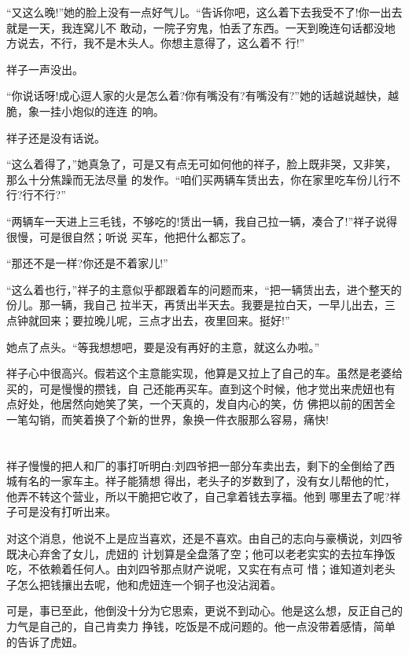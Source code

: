 \documentclass[11pt,a4paper,onecolumn]{article}
\begin{document}
``又这么晚!''她的脸上没有一点好气儿。``告诉你吧，这么着下去我受不了!你一出去就是一天，我连窝儿不
敢动，一院子穷鬼，怕丢了东西。一天到晚连句话都没地方说去，不行，我不是木头人。你想主意得了，这么着不
行!''

祥子一声没出。

``你说话呀!成心逗人家的火是怎么着?你有嘴没有?有嘴没有?''她的话越说越快，越脆，象一挂小炮似的连连
的响。

祥子还是没有话说。

``这么着得了，''她真急了，可是又有点无可如何他的祥子，脸上既非哭，又非笑，那么十分焦躁而无法尽量
的发作。``咱们买两辆车赁出去，你在家里吃车份儿行不行?行不行?''

``两辆车一天进上三毛钱，不够吃的!赁出一辆，我自己拉一辆，凑合了!''祥子说得很慢，可是很自然；听说
买车，他把什么都忘了。

``那还不是一样?你还是不着家儿!''

``这么着也行，''祥子的主意似乎都跟着车的问题而来，``把一辆赁出去，进个整天的份儿。那一辆，我自己
拉半天，再赁出半天去。我要是拉白天，一早儿出去，三点钟就回来；要拉晚儿呢，三点才出去，夜里回来。挺好!''

她点了点头。``等我想想吧，要是没有再好的主意，就这么办啦。''

祥子心中很高兴。假若这个主意能实现，他算是又拉上了自己的车。虽然是老婆给买的，可是慢慢的攒钱，自
己还能再买车。直到这个时候，他才觉出来虎妞也有点好处，他居然向她笑了笑，一个天真的，发自内心的笑，仿
佛把以前的困苦全一笔勾销，而笑着换了个新的世界，象换一件衣服那么容易，痛快!

\pagebreak
\section{}

祥子慢慢的把人和厂的事打听明白:刘四爷把一部分车卖出去，剩下的全倒给了西城有名的一家车主。祥子能猜想
得出，老头子的岁数到了，没有女儿帮他的忙，他弄不转这个营业，所以干脆把它收了，自己拿着钱去享福。他到
哪里去了呢?祥子可是没有打听出来。

对这个消息，他说不上是应当喜欢，还是不喜欢。由自己的志向与豪横说，刘四爷既决心弃舍了女儿，虎妞的
计划算是全盘落了空；他可以老老实实的去拉车挣饭吃，不依赖着任何人。由刘四爷那点财产说呢，又实在有点可
惜；谁知道刘老头子怎么把钱攘出去呢，他和虎妞连一个铜子也没沾润着。

可是，事已至此，他倒没十分为它思索，更说不到动心。他是这么想，反正自己的力气是自己的，自己肯卖力
挣钱，吃饭是不成问题的。他一点没带着感情，简单的告诉了虎妞。
\end{document}
